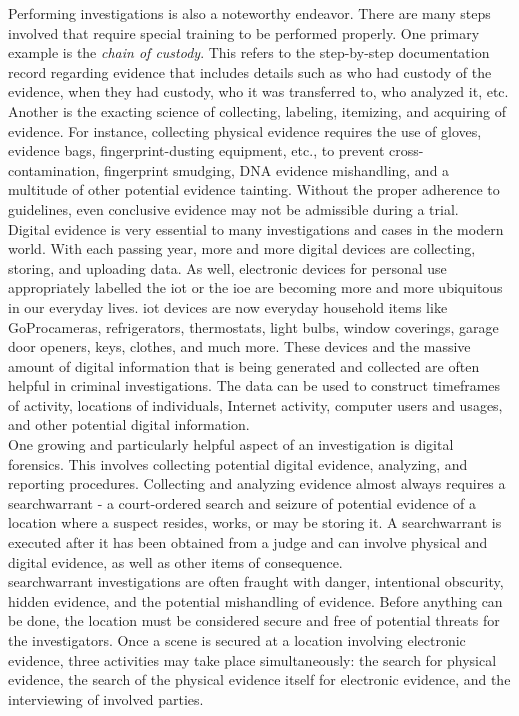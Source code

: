 \documentclass[12pt]{article}
\begin{document}
Performing investigations is also a noteworthy endeavor.  There are many steps involved that require special
training to be performed properly.  One primary example is the {\em chain of custody}.  This refers to the 
step-by-step documentation record regarding evidence that includes details such as who had custody of
the evidence, when they had custody, who it was transferred to, who analyzed it, etc. Another is the exacting
science of collecting, labeling, itemizing, and acquiring of evidence.
For instance, collecting physical evidence requires the use of gloves,
evidence bags, fingerprint-dusting equipment, etc., to prevent
cross-contamination, fingerprint smudging, DNA evidence mishandling,
and a multitude of other potential evidence tainting.  Without the
proper adherence to guidelines, even conclusive evidence may not be
admissible during a trial.\\

Digital evidence is very essential to many investigations and cases in the modern world.
With each passing year, more and more digital devices are collecting, storing, and uploading data.  As
well, electronic devices for personal use appropriately labelled the \gls{iot} or
the \gls{ioe} are becoming more and more
ubiquitous in our everyday lives.  \gls{iot} devices are now everyday household items like GoPro\texttrademark cameras,
refrigerators, thermostats, light bulbs, window coverings, garage door openers, keys, clothes, and much more.
These devices and the massive amount of digital information that
is being generated and collected are often helpful in criminal investigations.  The data can be used to
construct timeframes of activity, locations of individuals, Internet activity, computer users and usages,
and other potential digital information.\\

One growing and particularly helpful aspect of an investigation is digital forensics.
This involves collecting potential digital evidence, analyzing, and reporting procedures.
Collecting and analyzing evidence almost always requires a \gls{searchwarrant} - a court-ordered search and
seizure of potential evidence of a location where a suspect resides, works, or may be storing it.
A \gls{searchwarrant} is executed after it has been obtained from a judge and can involve physical and
digital evidence, as well as other items of consequence.\\

\Gls{searchwarrant} investigations are often fraught with danger, intentional obscurity, hidden evidence, and
the potential mishandling of evidence.  Before anything can be done, the location must be considered
secure and free of potential threats for the investigators.  Once a scene is
secured at a location involving electronic evidence, three activities
may take place simultaneously: the search for physical evidence, the search of the physical evidence
itself for electronic evidence, and the interviewing of involved parties.\\
\end{document}

